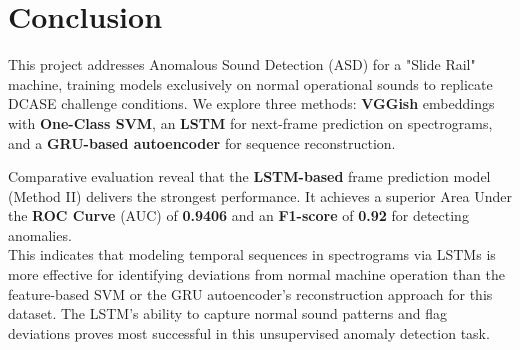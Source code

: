 \documentclass[ngerman]{scrartcl}
\begin{document}
\section*{Conclusion}

This project addresses Anomalous Sound Detection (ASD) for a "Slide Rail" machine, training models exclusively on normal operational sounds to replicate DCASE challenge conditions. We explore three methods: \textbf{VGGish} embeddings with\textbf{ One-Class SVM}, an \textbf{LSTM} for next-frame prediction on spectrograms, and a \textbf{GRU-based autoencoder} for sequence reconstruction.

Comparative evaluation reveal that the\textbf{ LSTM-based} frame prediction model (Method II) delivers the strongest performance. It achieves a superior Area Under the \textbf{ROC Curve} (AUC) of \textbf{0.9406} and an \textbf{F1-score} of\textbf{ 0.92} for detecting anomalies.\\
This indicates that modeling temporal sequences in spectrograms via LSTMs is more effective for identifying deviations from normal machine operation than the feature-based SVM or the GRU autoencoder's reconstruction approach for this dataset. The LSTM's ability to capture normal sound patterns and flag deviations proves most successful in this unsupervised anomaly detection task.
\end{document}
